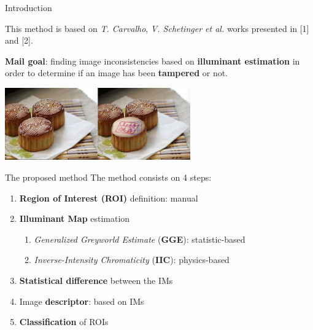 
\begin{tframe}{Introduction}

This method is based on \emph{T. Carvalho}, \emph{V. Schetinger et al. }works presented in [1] and [2].
\vspace{1cm}

\textbf{Mail goal}: finding image inconsistencies based on \textbf{illuminant estimation} in order to determine if an image has been \textbf{tampered} or not.

\begin{center}
\includegraphics[width=0.6\textwidth]{images/cakes.jpg}
\end{center}

\end{tframe}


\begin{tframe}{The proposed method}
\vspace{0.2cm}
The method consists on 4 steps:
\vspace{0.3cm}
\begin{enumerate}
\item \textbf{Region of Interest (ROI)} definition: manual
\vspace{0.3cm}
\item \textbf{Illuminant Map} estimation
\vspace{0.2cm}
\begin{enumerate}
\item\emph{ Generalized Greyworld Estimate} (\textbf{GGE}): statistic-based
\vspace{0.2cm}
\item \emph{Inverse-Intensity Chromaticity} (\textbf{IIC}): physics-based
\vspace{0.2cm}
\end{enumerate}
\item \textbf{Statistical difference} between the IMs
\vspace{0.2cm}
\item Image \textbf{descriptor}: based on IMs
\vspace{0.2cm}
\item \textbf{Classification} of ROIs 
\end{enumerate}

\end{tframe}

